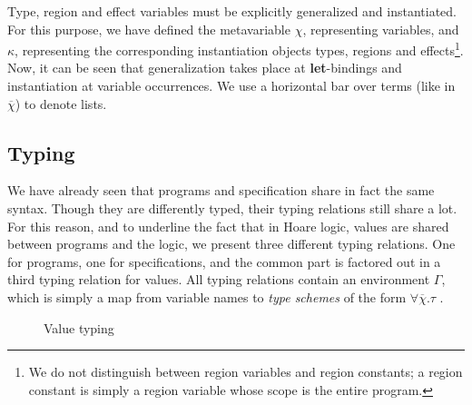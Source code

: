 \documentclass[a4paper]{llncs}
\newcommand{\letml}{{\bf let}}
\newcommand{\propml}{{\bf prop}}
\newcommand{\recml}{{\bf rec}}
\newcommand{\efft}[1]{\langle #1 \rangle}
\newcommand{\alist}[1]{\overline{#1} }
\begin{document}
Type, region and effect variables must be explicitly generalized and
instantiated. For this purpose, we have defined the metavariable $χ$,
representing variables, and $κ$, representing the corresponding instantiation
objects types, regions and effects\footnote{We do not distinguish between
region variables and region constants; a region constant is simply a region
variable whose scope is the entire program.}. Now, it can be seen that
generalization takes place at \letml-bindings and instantiation at variable
occurrences. We use a horizontal bar over terms (like in ${\overline{χ}}$) to
denote lists.

\subsection{Typing}

We have already seen that programs and specification share in fact the same
syntax. Though they are differently typed, their typing relations still share
a lot. For this reason, and to underline the fact that in Hoare logic, values
are shared between programs and the logic, we present three different typing
relations. One for programs, one for specifications, and the common part is
factored out in a third typing relation for values. All typing relations
contain an environment $Γ$, which is simply a map from variable names to {\em
type schemes} of the form $∀\alist{χ}.τ$ .

\begin{figure}[tbp]
  \caption{Value typing}
  \label{fig:valuetyping}
\end{figure}
\end{document}
